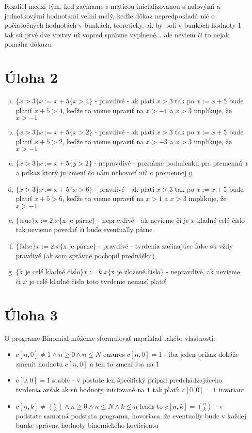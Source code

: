 \documentclass[a4paper]{article}
\begin{document}
Rozdiel medzi tým, keď začíname s maticou inicializovanou s nulovými a jednotkovými hodnotami veľmi malý, keďže dôkaz nepredpokladá nič o počiatočných hodnotách v bunkách, teoreticky, ak by boli v bunkách hodnoty 1 tak sú prvé dve vrstvy už vopred správne vyplnené... ale neviem či to nejak pomáha dôkazu.

\section{Úloha 2}

\begin{enumerate}[a)]
	\item $\{x>3\}x:=x+5\{x>4\}$ - pravdivé - ak platí $x>3$ tak po $x:=x+5$ bude platiť $x+5>4$, keďže to vieme upraviť na $x>-1$ a $x>3$ implikuje, že $x>-1$
	\item $\{x>3\}x:=x+5\{x>2\}$ - pravdivé - ak platí $x>3$ tak po $x:=x+5$ bude platiť $x+5>2$, keďže to vieme upraviť na $x>-3$ a $x>3$ implikuje, že $x>-1$
	\item $\{x>3\}x:=x+5\{y>2\}$ - nepravdivé - poznáme podmienku pre premennú $x$ a príkaz ktorý ju zmení čo nám nehovorí nič o premennej $y$
	\item $\{x>3\}x:=x+5\{x>6\}$ - pravdivé - ak platí $x>3$ tak po $x:=x+5$ bude platiť $x+5>6$, keďže to vieme upraviť na $x>1$ a $x>3$ implikuje, že $x>-1$
	\item $\{\text{true}\}x:=2.x\{\text{x je párne}\}$ - nepravdivé - ak nevieme či je $x$ kladné celé číslo tak nevieme povedať či bude eventually párne
	\item $\{\text{false}\}x:=2.x\{\text{x je párne}\}$ - pravdivé - tvrdenia začínajúce false sú vždy pravdivé (ak som správne pochopil prednášku)
	\item $\{\text{k je celé kladné číslo}\}x:=k.x\{\text{x je zložené číslo}\}$ - nepravdivé, ak nevieme, či $x$ je celé kladné číslo toto tvrdenie nemusí platiť
\end{enumerate} 

\section{Úloha 3}

O programe Binomial môžeme sformulovať napríklad takéto vlastnosti:

\begin{itemize}
	\item $c[n, 0] \neq 1 \land n \geq 0 \land n \leq N $ ensures $c[n, 0] = 1$ - iba jeden príkaz dokáže zmeniť hodnotu $c[n, 0]$ a ten to zmení iba na $1$
	\item $c[0, 0] = 1$ stable - v postate len špecifický prípad predchádzajúceho tvrdenia avšak ak sú hodnoty iniciované na $1$ tak platí: $c[0, 0] = 1$ invariant
	\item $c[n, k] \neq \binom{n}{k} \land n \geq 0 \land n \leq N \land k \leq n$ leads-to $c[n, k] = \binom{n}{k}$ - v podstate samotná podstata programu, hovoriaca, že eventually bude v každej bunke správna hodnoty binomického koeficientu
\end{itemize}
\end{document}
